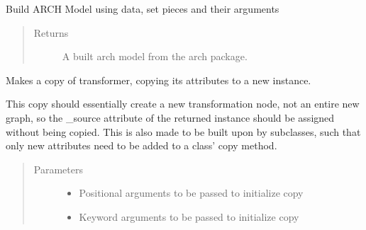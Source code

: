 \documentclass[letterpaper,10pt,english]{sphinxmanual}
\begin{document}
\begin{fulllineitems}
\begin{fulllineitems}
\begin{quote}
\begin{description}
\end{description}\end{quote}

\end{fulllineitems}


\begin{fulllineitems}
\label{\detokenize{dalio.pipe:dalio.pipe.builders.MakeARCH.build_model}}
Build ARCH Model using data, set pieces and their arguments
\begin{quote}\begin{description}
\item[{Returns}] \leavevmode
A built arch model from the arch package.

\end{description}\end{quote}

\end{fulllineitems}


\begin{fulllineitems}
\label{\detokenize{dalio.pipe:dalio.pipe.builders.MakeARCH.copy}}
Makes a copy of transformer, copying its attributes to a new
instance.

This copy should essentially create a new transformation node, not an
entire new graph, so the \_source attribute of the returned instance
should be assigned without being copied. This is also made to be built
upon by subclasses, such that only new attributes need to be added to
a class’ copy method.
\begin{quote}\begin{description}
\item[{Parameters}] \leavevmode\begin{itemize}
\item {} 
 \textendash{} Positional arguments to be passed to initialize copy

\item {} 
 \textendash{} Keyword arguments to be passed to initialize copy


\end{itemize}
\end{description}
\end{quote}
\end{fulllineitems}
\end{fulllineitems}
\end{document}
